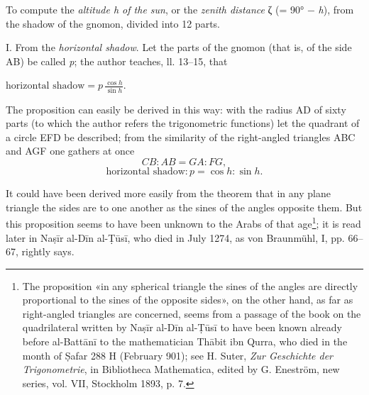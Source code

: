 \documentclass[11pt]{article}
\newcommand{\Pg}[1]{\marginpar{\footnotesize\color{gray}#1}}
\begin{document}
\par To compute the \emph{altitude h of the sun}, or the \emph{zenith distance} {\greekfont ζ} (= 90° − \emph{h}), from the shadow of the gnomon, divided into 12 parts.\par
\begin{center}\end{center}
\par I. From the \emph{horizontal shadow}. Let the parts of the gnomon (that is, of the side AB) be called \emph{p}; the author teaches, ll. 13–15, that \par\noindent\hspace*{1.5em}$\displaystyle \text{horizontal shadow} = p\,\frac{\cos h}{\sin h}.$\par The proposition can easily be derived in this way: with the radius AD of sixty parts (to which the author refers the trigonometric functions) let the quadrant of a circle EFD be described; from the similarity of the right-angled triangles ABC and AGF one gathers at once \[ CB : AB = GA : FG, \] \[ \text{horizontal shadow} : p = \cos h : \sin h. \]\par
\par \Pg{I 181}It could have been derived more easily from the theorem that in any plane triangle the sides are to one another as the sines of the angles opposite them. But this proposition seems to have been unknown to the Arabs of that age\footnote{The proposition «in any spherical triangle the sines of the angles are directly proportional to the sines of the opposite sides», on the other hand, as far as right-angled triangles are concerned, seems from a passage of the book on the quadrilateral written by Naṣīr al-Dīn al-Ṭūsī to have been known already before al-Battānī to the mathematician Thābit ibn Qurra, who died in the month of Ṣafar 288 H (February 901); see H. Suter, \emph{Zur Geschichte der Trigonometrie}, in Bibliotheca Mathematica, edited by G. Eneström, new series, vol. VII, Stockholm 1893, p. 7.}; it is read later in Naṣīr al-Dīn al-Ṭūsī, who died in July 1274, as von Braunmühl, I, pp. 66–67, rightly says.\par
\end{document}
